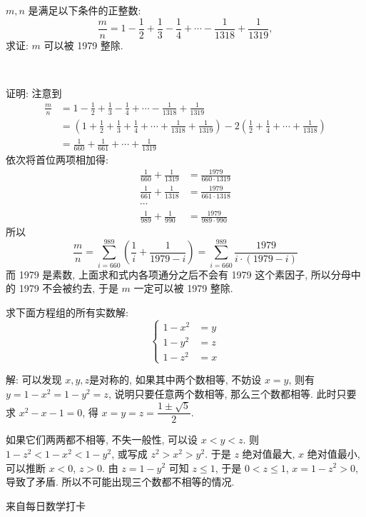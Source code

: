 $m,n$ 是满足以下条件的正整数:
\[\frac{m}{n} = 1 - \frac{1}{2} + \frac{1}{3} - \frac{1}{4} + \cdots -\frac{1}{1318} + \frac{1}{1319}, \]
求证: $m$ 可以被 1979 整除.

~

证明: 注意到
\begin{align*}
\frac{m}{n} &= 1 - \frac{1}{2} + \frac{1}{3} - \frac{1}{4} + \cdots -\frac{1}{1318} + \frac{1}{1319} \\
&= \left(1 + \frac{1}{2} + \frac{1}{3} + \frac{1}{4} + \cdots + \frac{1}{1318} + \frac{1}{1319}\right) - 2\left(\frac{1}{2}+\frac{1}{4}+\cdots+\frac{1}{1318}\right)\\
&= \frac{1}{660} + \frac{1}{661} + \cdots + \frac{1}{1319}
\end{align*}
依次将首位两项相加得:
\begin{align*}
\frac{1}{660} + \frac{1}{1319} &= \frac{1979}{660\cdot 1319}\\
\frac{1}{661} + \frac{1}{1318} &= \frac{1979}{661\cdot 1318}\\
\cdots & \\
\frac{1}{989} + \frac{1}{990} &= \frac{1979}{989\cdot 990}
\end{align*}
所以 
\[\frac{m}{n} = \sum_{i=660}^{989}{\left(\frac{1}{i} + \frac{1}{1979-i}\right)} = \sum_{i=660}^{989}\frac{1979}{i\cdot(1979-i)}\]
而 1979 是素数, 上面求和式内各项通分之后不会有 1979 这个素因子, 所以分母中的 1979 不会被约去, 于是 $m$ 一定可以被 1979 整除.

\newpage
求下面方程组的所有实数解:
\[
\begin{cases}
1 - x^2 & = y \\
1 - y^2 & = z \\
1 - z^2 & = x 
\end{cases}
\]

解: 可以发现 $x,y,z $是对称的, 如果其中两个数相等, 不妨设 $ x=y $, 则有 $ y = 1 - x^2 = 1 - y^2 = z $, 说明只要任意两个数相等, 那么三个数都相等. 此时只要求 $ x^2 - x - 1 = 0 $, 得 $ x = y = z = \dfrac{1\pm \sqrt{5}}{2} $.

如果它们两两都不相等, 不失一般性, 可以设 $ x < y < z $. 则 $ 1-z^2 < 1-x^2 < 1-y^2 $, 或写成 $ z^2 > x^2 > y^2 $. 于是 $z$ 绝对值最大, $x$ 绝对值最小, 可以推断 $ x < 0 $, $ z > 0 $. 由 $ z = 1 - y^2 $ 可知 $ z \le 1 $, 于是 $ 0 < z \le 1 $, $ x = 1 - z^2 > 0 $, 导致了矛盾. 所以不可能出现三个数都不相等的情况.

\newpage
\noindent 来自每日数学打卡

